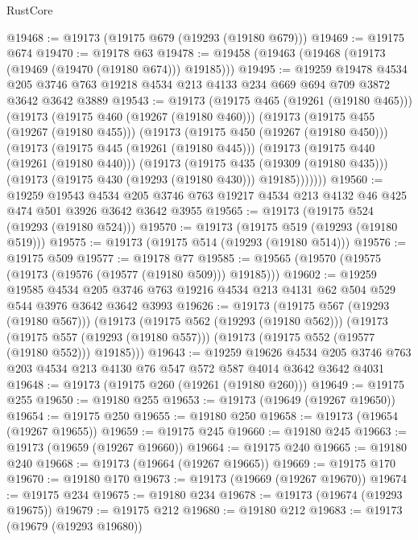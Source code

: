 \begin{lexlean}{RustCore}
\begin{coremodule}
@19468 := @19173 (@19175 @679 (@19293 (@19180 @679)))
@19469 := @19175 @674
@19470 := @19178 @63
@19478 := @19458 (@19463 (@19468 (@19173 (@19469 (@19470 (@19180 @674))) @19185)))
@19495 := @19259
    @19478
    @4534
    @205
    @3746
    @763
    @19218
    @4534
    @213
    @4133
    @234
    @669
    @694
    @709
    @3872
    @3642
    @3642
    @3889
@19543 := @19173
    (@19175 @465 (@19261 (@19180 @465)))
    (@19173
      (@19175 @460 (@19267 (@19180 @460)))
      (@19173
        (@19175 @455 (@19267 (@19180 @455)))
        (@19173
          (@19175 @450 (@19267 (@19180 @450)))
          (@19173
            (@19175 @445 (@19261 (@19180 @445)))
            (@19173
              (@19175 @440 (@19261 (@19180 @440)))
              (@19173
                (@19175 @435 (@19309 (@19180 @435)))
                (@19173 (@19175 @430 (@19293 (@19180 @430))) @19185)))))))
@19560 := @19259
    @19543
    @4534
    @205
    @3746
    @763
    @19217
    @4534
    @213
    @4132
    @46
    @425
    @474
    @501
    @3926
    @3642
    @3642
    @3955
@19565 := @19173 (@19175 @524 (@19293 (@19180 @524)))
@19570 := @19173 (@19175 @519 (@19293 (@19180 @519)))
@19575 := @19173 (@19175 @514 (@19293 (@19180 @514)))
@19576 := @19175 @509
@19577 := @19178 @77
@19585 := @19565 (@19570 (@19575 (@19173 (@19576 (@19577 (@19180 @509))) @19185)))
@19602 := @19259
    @19585
    @4534
    @205
    @3746
    @763
    @19216
    @4534
    @213
    @4131
    @62
    @504
    @529
    @544
    @3976
    @3642
    @3642
    @3993
@19626 := @19173
    (@19175 @567 (@19293 (@19180 @567)))
    (@19173
      (@19175 @562 (@19293 (@19180 @562)))
      (@19173
        (@19175 @557 (@19293 (@19180 @557)))
        (@19173 (@19175 @552 (@19577 (@19180 @552))) @19185)))
@19643 := @19259
    @19626
    @4534
    @205
    @3746
    @763
    @203
    @4534
    @213
    @4130
    @76
    @547
    @572
    @587
    @4014
    @3642
    @3642
    @4031
@19648 := @19173 (@19175 @260 (@19261 (@19180 @260)))
@19649 := @19175 @255
@19650 := @19180 @255
@19653 := @19173 (@19649 (@19267 @19650))
@19654 := @19175 @250
@19655 := @19180 @250
@19658 := @19173 (@19654 (@19267 @19655))
@19659 := @19175 @245
@19660 := @19180 @245
@19663 := @19173 (@19659 (@19267 @19660))
@19664 := @19175 @240
@19665 := @19180 @240
@19668 := @19173 (@19664 (@19267 @19665))
@19669 := @19175 @170
@19670 := @19180 @170
@19673 := @19173 (@19669 (@19267 @19670))
@19674 := @19175 @234
@19675 := @19180 @234
@19678 := @19173 (@19674 (@19293 @19675))
@19679 := @19175 @212
@19680 := @19180 @212
@19683 := @19173 (@19679 (@19293 @19680))

\end{coremodule}
\end{lexlean}
